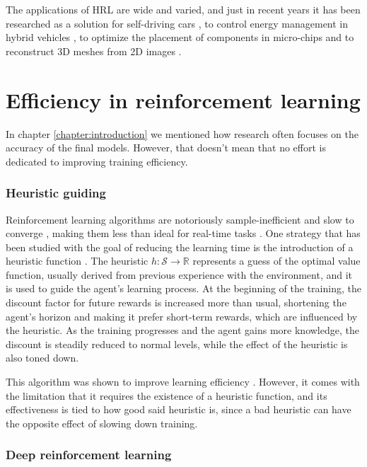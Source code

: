 The applications of HRL are wide and varied, and just in recent years it has been researched as a solution for self-driving cars \cite{Duan:2020}, to control energy management in hybrid vehicles \cite{Qi:2022}, to optimize the placement of components in micro-chips \cite{Tan:2024} and to reconstruct 3D meshes from 2D images \cite{Li:2023}.

\section{Efficiency in reinforcement learning}

In chapter \ref{chapter:introduction} we mentioned how research often focuses on the accuracy of the final models. However, that doesn't mean that no effort is dedicated to improving training efficiency.

\subsubsection*{Heuristic guiding}

Reinforcement learning algorithms are notoriously sample-inefficient and slow to converge \cite{Botvinick:2019}, making them less than ideal for real-time tasks \cite{Bianchi:2004}. One strategy that has been studied with the goal of reducing the learning time is the introduction of a heuristic function \cite{Cheng:2021}. The heuristic $h:\mathcal{S}\to\mathbb{R}$ represents a guess of the optimal value function, usually derived from previous experience with the environment, and it is used to guide the agent's learning process. At the beginning of the training, the discount factor for future rewards is increased more than usual, shortening the agent's horizon and making it prefer short-term rewards, which are influenced by the heuristic. As the training progresses and the agent gains more knowledge, the discount is steadily reduced to normal levels, while the effect of the heuristic is also toned down.

This algorithm was shown to improve learning efficiency \cite{Cheng:2021}. However, it comes with the limitation that it requires the existence of a heuristic function, and its effectiveness is tied to how good said heuristic is, since a bad heuristic can have the opposite effect of slowing down training.

\subsubsection*{Deep reinforcement learning}


